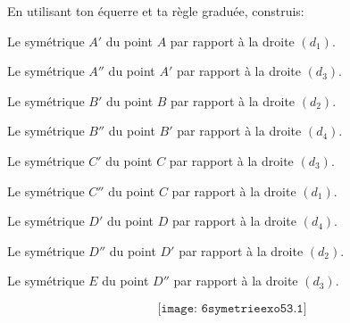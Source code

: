 En utilisant ton équerre et ta règle graduée, construis:
\begin{myenumerate}
	\item Le symétrique $A'$ du point $A$ par rapport à la droite $(d_1)$.
	\item Le symétrique $A''$ du point $A'$ par rapport à la droite $(d_3)$.
	\item Le symétrique $B'$ du point $B$ par rapport à la droite $(d_2)$.
	\item Le symétrique $B''$ du point $B'$ par rapport à la droite $(d_4)$.
	\item Le symétrique $C'$ du point $C$ par rapport à la droite $(d_3)$.
	\item Le symétrique $C''$ du point $C$ par rapport à la droite $(d_1)$.
	\item Le symétrique $D'$ du point $D$ par rapport à la droite $(d_4)$.
	\item Le symétrique $D''$ du point $D'$ par rapport à la droite $(d_2)$.
	\item Le symétrique $E$ du point $D''$ par rapport à la droite $(d_3)$.
\end{myenumerate}
\[\texttt{[image: 6symetrieexo53.1]}\]